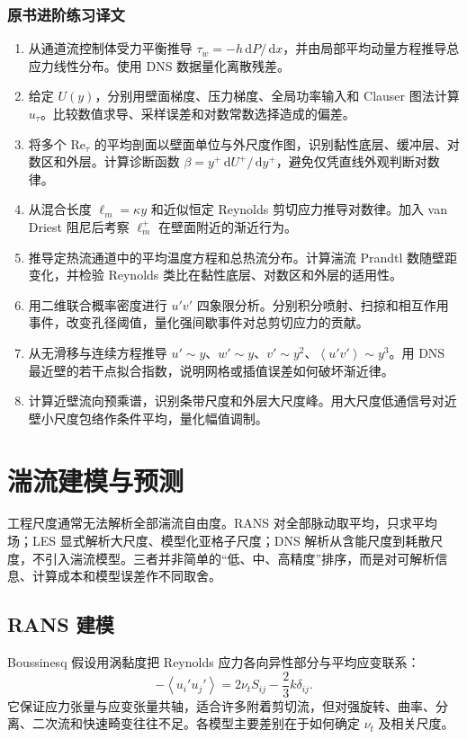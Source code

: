 \documentclass[12pt,a4paper,openany,fontset=none]{ctexbook}
\newcommand{\Rey}{\mathrm{Re}}
\newcommand{\dd}{\,\mathrm d}
\newcommand{\avg}[1]{\left\langle #1\right\rangle}
\begin{document}
\enlargethispage{5\baselineskip}
\subsection*{原书进阶练习译文}
\begin{enumerate}[label=\arabic*.,itemsep=0.05em,topsep=0.2em]
 \item 从通道流控制体受力平衡推导 $\tau_w=-h\dd P/\dd x$，并由局部平均动量方程推导总应力线性分布。使用 DNS 数据量化离散残差。
 \item 给定 $U(y)$，分别用壁面梯度、压力梯度、全局功率输入和 Clauser 图法计算 $u_\tau$。比较数值求导、采样误差和对数常数选择造成的偏差。
 \item 将多个 $\Rey_\tau$ 的平均剖面以壁面单位与外尺度作图，识别黏性底层、缓冲层、对数区和外层。计算诊断函数 $\beta=y^+\dd U^+/\dd y^+$，避免仅凭直线外观判断对数律。
 \item 从混合长度 $\ell_m=\kappa y$ 和近似恒定 Reynolds 剪切应力推导对数律。加入 van Driest 阻尼后考察 $\ell_m^+$ 在壁面附近的渐近行为。
 \item 推导定热流通道中的平均温度方程和总热流分布。计算湍流 Prandtl 数随壁距变化，并检验 Reynolds 类比在黏性底层、对数区和外层的适用性。
 \item 用二维联合概率密度进行 $u'v'$ 四象限分析。分别积分喷射、扫掠和相互作用事件，改变孔径阈值，量化强间歇事件对总剪切应力的贡献。
 \item 从无滑移与连续方程推导 $u'\sim y$、$w'\sim y$、$v'\sim y^2$、$\avg{u'v'}\sim y^3$。用 DNS 最近壁的若干点拟合指数，说明网格或插值误差如何破坏渐近律。
 \item 计算近壁流向预乘谱，识别条带尺度和外层大尺度峰。用大尺度低通信号对近壁小尺度包络作条件平均，量化幅值调制。
\end{enumerate}
\chapter{湍流建模与预测}

工程尺度通常无法解析全部湍流自由度。RANS 对全部脉动取平均，只求平均场；LES 显式解析大尺度、模型化亚格子尺度；DNS 解析从含能尺度到耗散尺度，不引入湍流模型。三者并非简单的“低、中、高精度”排序，而是对可解析信息、计算成本和模型误差作不同取舍。

\section{RANS 建模}

Boussinesq 假设用涡黏度把 Reynolds 应力各向异性部分与平均应变联系：
\begin{equation}
 -\avg{u_i'u_j'}=2\nu_tS_{ij}-\frac23k\delta_{ij}.
\end{equation}
它保证应力张量与应变张量共轴，适合许多附着剪切流，但对强旋转、曲率、分离、二次流和快速畸变往往不足。各模型主要差别在于如何确定 $\nu_t$ 及相关尺度。
\end{document}
